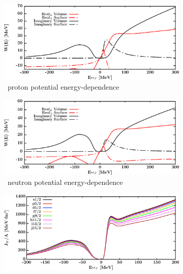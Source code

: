 \begin{figure}[hbtp]
\begin{subfigure}[b]{0.45\textwidth}
        \centering
        \includegraphics[width=\linewidth]{figures/pb208_protonPotentials.png}
        \caption{\pbEight\ proton potential energy-dependence}
        \label{DOMFitData_pb208_proton_potentialComponent_energy}
    \end{subfigure}\hspace{6pt}
    \begin{subfigure}[b]{0.45\linewidth}
        \centering
        \includegraphics[width=\linewidth]{figures/pb208_neutronPotentials.png}
        \caption{\pbEight\ neutron potential energy-dependence}
        \label{DOMFitData_pb208_neutron_potentialComponent_energy}
    \end{subfigure}\vspace{0.3in}
    \begin{subfigure}[b]{0.45\textwidth}
        \centering
        \includegraphics[width=\linewidth]{figures/pb208_protonVolumeIntegrals.png}

\end{subfigure}
\end{figure}
